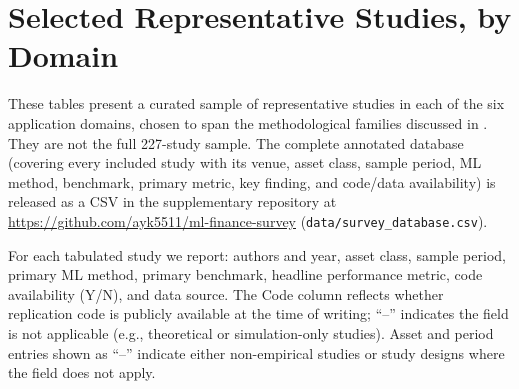 \section{Selected Representative Studies, by Domain}\label{sec:appendix_tables}

These tables present a curated sample of representative studies in each of the six application domains, chosen to span the methodological families discussed in . They are not the full 227-study sample. The complete annotated database (covering every included study with its venue, asset class, sample period, ML method, benchmark, primary metric, key finding, and code/data availability) is released as a CSV in the supplementary repository at \url{https://github.com/ayk5511/ml-finance-survey} (\texttt{data/survey\_database.csv}).

For each tabulated study we report: authors and year, asset class, sample period, primary ML method, primary benchmark, headline performance metric, code availability (Y/N), and data source. The Code column reflects whether replication code is publicly available at the time of writing; ``--'' indicates the field is not applicable (e.g., theoretical or simulation-only studies). Asset and period entries shown as ``--'' indicate either non-empirical studies or study designs where the field does not apply.

\renewcommand{\arraystretch}{1.15}
\setlength{\tabcolsep}{5pt}
\footnotesize

